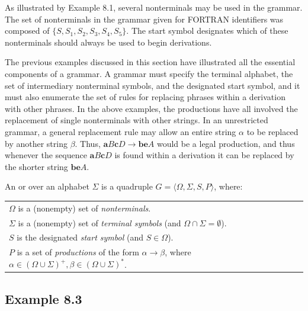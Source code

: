 As illustrated by Example 8.1, several nonterminals may be used in the grammar.
The set of nonterminals in the grammar given for FORTRAN identifiers was
composed of $\{S,S_1,S_2,S_3,S_4,S_5\}$. The start symbol designates which of
these nonterminals should always be used to begin derivations.

The previous examples discussed in this section have illustrated all the
essential components of a grammar. A grammar must specify the terminal alphabet,
the set of intermediary nonterminal symbols, and the designated start symbol,
and it must also enumerate the set of rules for replacing phrases within a
derivation with other phrases. In the above examples, the productions have all
involved the replacement of single nonterminals with other strings. In an
unrestricted grammar, a general replacement rule may allow an entire string
$\alpha$ to be replaced by another string $\beta$.
Thus, $\pmb{a}B\pmb{c}D \rightarrow \pmb{be}A$
would be a legal production, and thus whenever the sequence $\pmb{a}B\pmb{c}D$
is found within a derivation it can be replaced by the shorter
string $\pmb{be}A$.

\begin{dfn}\label{dfn-8.1}
An \emph{} or \emph{} over an alphabet
$\Sigma$ is a quadruple $G=\langle\Omega,\Sigma,S,P\rangle$, where:
\begin{center}\begin{tabular}{l}
$\Omega$ is a (nonempty) set of \emph{nonterminals}. \\
$\Sigma$ is a (nonempty) set of \emph{terminal symbols} (and $\Omega\cap\Sigma =
	\emptyset$). \\
$S$ is the designated \emph{start symbol} (and $S \in \Omega$). \\
$P$ is a set of \emph{productions} of the form $\alpha\rightarrow\beta$, where
	$\alpha\in(\Omega\cup\Sigma)^+, \beta\in(\Omega\cup\Sigma)^*$.
\end{tabular}\end{center}
\end{dfn}

\subsection*{Example 8.3}

